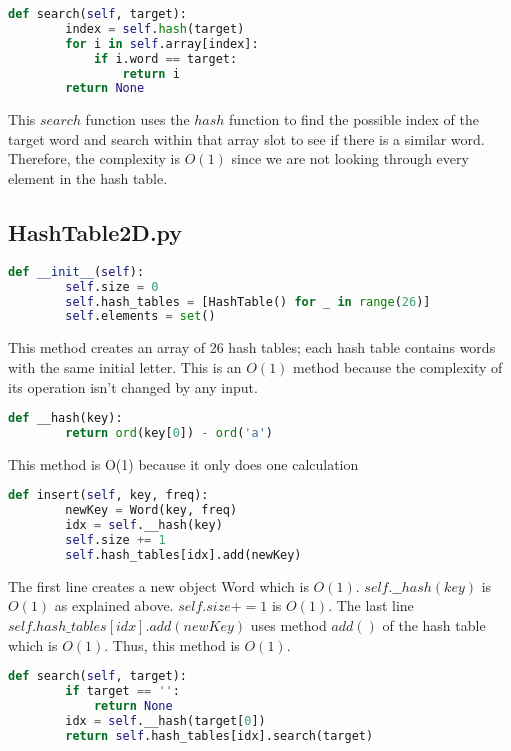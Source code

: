 \documentclass[10pt]{article}
\theoremstyle{definition}
\begin{document}
\begin{lstlisting}[language=Python, basicstyle=\small]
    def search(self, target):
        index = self.hash(target)
        for i in self.array[index]:
            if i.word == target:
                return i
        return None
\end{lstlisting}
This $search$ function uses the $hash$ function to find the possible index of the target word and search within that array slot to see if there is a similar word. Therefore, the complexity is $O(1)$ since we are not looking through every element in the hash table.


\subsection{HashTable2D.py}

\begin{lstlisting}[language=Python, basicstyle=\small]
    def __init__(self):
        self.size = 0
        self.hash_tables = [HashTable() for _ in range(26)]
        self.elements = set()
\end{lstlisting}
This method creates an array of 26 hash tables; each hash table contains words with the same initial letter. This is an $O(1)$ method because the complexity of its operation isn't changed by any input.

\begin{lstlisting}[language=Python, basicstyle=\small]
    def __hash(key):
        return ord(key[0]) - ord('a')
\end{lstlisting}
This method is O(1) because it only does one calculation

\begin{lstlisting}[language=Python, basicstyle=\small]
    def insert(self, key, freq):
        newKey = Word(key, freq)
        idx = self.__hash(key)
        self.size += 1
        self.hash_tables[idx].add(newKey)
\end{lstlisting}
The first line creates a new object Word which is $O(1)$. $self.\_\_hash(key)$ is $O(1)$ as explained above. $self.size += 1$ is $O(1)$. The last line $self.hash\_tables[idx].add(newKey)$ uses method $add()$ of the hash table which is $O(1)$. Thus, this method is $O(1)$.

\begin{lstlisting}[language=Python, basicstyle=\small]
    def search(self, target):
        if target == '':
            return None
        idx = self.__hash(target[0])
        return self.hash_tables[idx].search(target)
\end{lstlisting}
\end{document}
